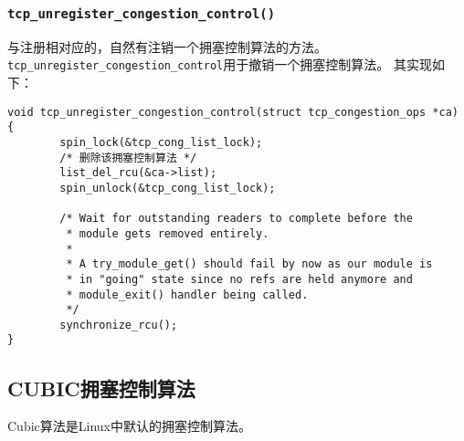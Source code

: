\subsubsection{\texttt{tcp_unregister_congestion_control()}}
与注册相对应的，自然有注销一个拥塞控制算法的方法。
\texttt{tcp_unregister_congestion_control}用于撤销一个拥塞控制算法。
其实现如下：
\begin{verbatim}
void tcp_unregister_congestion_control(struct tcp_congestion_ops *ca)
{
        spin_lock(&tcp_cong_list_lock);
        /* 删除该拥塞控制算法 */
        list_del_rcu(&ca->list);
        spin_unlock(&tcp_cong_list_lock);

        /* Wait for outstanding readers to complete before the
         * module gets removed entirely.
         *
         * A try_module_get() should fail by now as our module is
         * in "going" state since no refs are held anymore and
         * module_exit() handler being called.
         */
        synchronize_rcu();
}
\end{verbatim}

\subsection{CUBIC拥塞控制算法}
Cubic算法是Linux中默认的拥塞控制算法。


